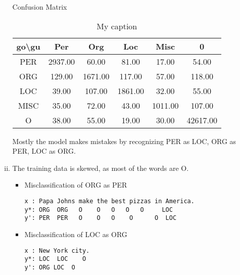 \documentclass{article}[11pt]
\begin{document}
\begin{enumerate}[(a)]
\begin{enumerate}[i.]
	Confusion Matrix
	\begin{table}[H]
		\centering
		\caption{My caption}
		\label{my-label}
		\begin{tabular}{|c|c|c|c|c|c|}
		\hline
		go\textbackslash gu & Per & Org & Loc & Misc & 0 
		\\ \hline
		PER    	&	2937.00  & 	60.00  &	81.00   &	17.00   &	54.00 \\ \hline  
		ORG     &	129.00  &	1671.00 &	117.00  &	57.00   &	118.00  \\ \hline
		LOC     &	39.00   &	107.00  &	1861.00 &	32.00   &	55.00   \\ \hline
		MISC    &	35.00   &	72.00   &	43.00   &	1011.00 &	107.00  \\ \hline
		O       &	38.00   &	55.00   &	19.00   &	30.00   &	42617.00 \\ \hline
		\end{tabular}
		\end{table}
 Mostly the model makes mistakes by recognizing PER as LOC, ORG as PER, LOC as ORG.
 \item The training data is skewed, as most of the words are O. 
 \begin{itemize}
 	\item Misclassification of ORG as PER
\begin{verbatim}
x : Papa Johns make the best pizzas in America. 
y*: ORG  ORG   O	O 	O	O	O     LOC                                          
y': PER  PER   O    O   O    O      O  LOC
\end{verbatim}
\item Misclassification of LOC as ORG
\begin{verbatim}
x : New York city. 
y*: LOC  LOC 	O                       
y': ORG LOC  O  
\end{verbatim}
\end{itemize}
 \end{enumerate}

\end{enumerate}
\end{document}
